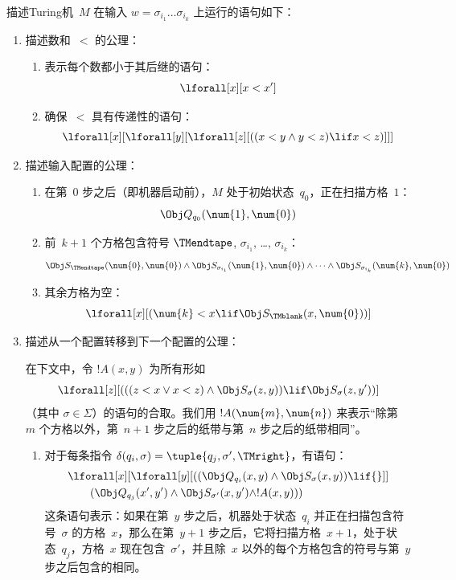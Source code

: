 \documentclass[../../../include/open-logic-section]{subfiles}
\begin{document}
描述Turing机~\(M\) 在输入 $w = \sigma_{i_1}\dots\sigma_{i_k}$ 上运行的语句如下：
\begin{enumerate}
\item 描述数和~$<$ 的公理：
\begin{enumerate}
\item 表示每个数都小于其后继的语句：
\[
\lforall[x][x < x']
\]
\item 确保~$<$ 具有传递性的语句：
\[
\lforall[x][\lforall[y][\lforall[z][
      ((x < y \land y < z) \lif x < z)]]]
\]
\end{enumerate}
\item 描述输入配置的公理：
\begin{enumerate}
\item 在第~$0$ 步之后（即机器启动前），$M$ 处于初始状态~$q_0$，正在扫描方格~$1$：
\[
\Obj Q_{q_0}(\num{1}, \num{0})
\]
\item 前~$k+1$ 个方格包含符号 $\TMendtape$, $\sigma_{i_1}$, \dots, $\sigma_{i_k}$：
\[
\Obj S_\TMendtape(\num{0}, \num{0}) \land
\Obj S_{\sigma_{i_1}}(\num{1}, \num{0}) \land
\dots \land
\Obj S_{\sigma_{i_k}}(\num{k}, \num{0})
\]
\item 其余方格为空：
\[
\lforall[x][(\num{k} < x \lif \Obj S_\TMblank(x, \num{0}))]
\]
\end{enumerate}
\item 描述从一个配置转移到下一个配置的公理：

在下文中，令 $!A(x, y)$ 为所有形如
\[
\lforall[z][
  (((z < x \lor x < z) \land \Obj S_\sigma(z, y))
  \lif \Obj S_\sigma(z, y'))]
\]
（其中 $\sigma \in \Sigma$）的语句的合取。我们用 $!A(\num{m},\num{n})$ 来表示“除第~$m$ 个方格以外，第~$n+1$ 步之后的纸带与第~$n$ 步之后的纸带相同”。
\begin{enumerate}
\item {} 对于每条指令 $\delta(q_i, \sigma) =
  \tuple{q_j, \sigma', \TMright}$，有语句：
\begin{align*}
& \lforall[x][\lforall[y][(
   (\Obj Q_{q_i}(x, y) \land \Obj S_{\sigma}(x, y)) \lif {}]] \\
&\qquad   (\Obj Q_{q_j}(x', y') \land \Obj S_{\sigma'}(x, y') \land
!A(x, y)))
\end{align*}
这条语句表示：如果在第~$y$ 步之后，机器处于状态~$q_i$ 并正在扫描包含符号~$\sigma$ 的方格~$x$，那么在第~$y+1$ 步之后，它将扫描方格~$x+1$，处于状态~$q_j$，方格~$x$ 现在包含~$\sigma'$，并且除~$x$ 以外的每个方格包含的符号与第~$y$ 步之后包含的相同。


\end{enumerate}
\end{enumerate}
\end{document}
